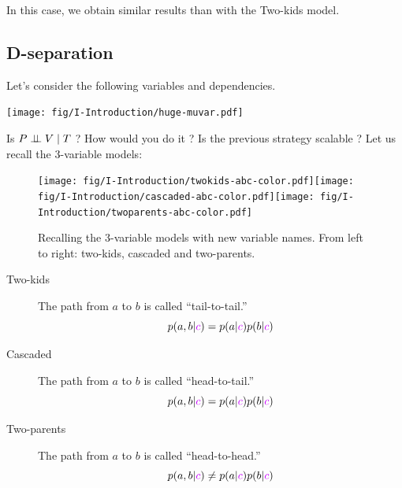 In this case, we obtain similar results than with the Two-kids model.\vspace{3mm}



\subsection{D-separation}
Let's consider the following variables and dependencies.
\begin{center}
\texttt{[image: fig/I-Introduction/huge-muvar.pdf]}
\end{center}
Is $P \perp\!\!\!\perp V \;|\; T$ ? How would you do it ? Is the previous strategy scalable ? Let us recall the 3-variable models:

\begin{figure}[H]
\centering
\texttt{[image: fig/I-Introduction/twokids-abc-color.pdf]}\hspace{1cm}\texttt{[image: fig/I-Introduction/cascaded-abc-color.pdf]}\hspace{2cm}\texttt{[image: fig/I-Introduction/twoparents-abc-color.pdf]}
\caption{Recalling the 3-variable models with new variable names. From left to right: two-kids, cascaded and two-parents.\label{fig:3-var-highlighted}}
\end{figure}
\begin{description}
 \item[Two-kids] The path from $a$ to $b$ is called ``tail-to-tail.''
  \begin{equation}p(a,b|{\color{mypurple}c}) = p(a|{\color{mypurple}c})p(b|{\color{mypurple}c}) \end{equation}
 \item[Cascaded] The path from $a$ to $b$ is called ``head-to-tail.''
  \begin{equation}p(a,b|{\color{mypurple}c}) = p(a|{\color{mypurple}c})p(b|{\color{mypurple}c})\end{equation} 
 \item[Two-parents] The path from $a$ to $b$ is called ``head-to-head.''
  \begin{equation}p(a,b|{\color{mypurple}c}) \neq p(a|{\color{mypurple}c})p(b|{\color{mypurple}c})\end{equation}  
\end{description}

